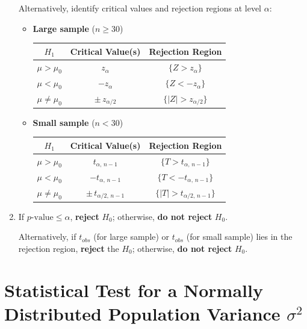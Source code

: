 \documentclass[twoside]{book}
\begin{document}
\begin{enumerate}
Alternatively, identify critical values and rejection regions at level $\alpha$:

	\begin{itemize}

		\item \textbf{Large sample} (\(n \ge 30\))
		\begin{table}[H]
			\centering
			\begin{tabular}{@{}c|c|c@{}}
				\toprule
				\textbf{$H_1$} & \textbf{Critical Value(s)} & \textbf{Rejection Region} \\
				\midrule
				$\mu > \mu_0$ & $ z_{\alpha} $ &
				\(\{Z>z_{\alpha}\}\) \\[6pt]
				$\mu < \mu_0$ &
				$ -z_{\alpha} $ &
				\(\{Z<-z_{\alpha}\}\) \\[6pt]
				$\mu \neq \mu_0$ &
				$ \pm\,z_{\alpha/2} $&
				$\{|Z| > z_{\alpha/2}\}$ \\
				\bottomrule
			\end{tabular}
		\end{table}
	\item \textbf{Small sample} (\(n < 30\))
		\begin{table}[H]
			\centering
			\begin{tabular}{@{}c|c|c@{}}
				\toprule
				\textbf{$H_1$} & \textbf{Critical Value(s)} & \textbf{Rejection Region} \\
				\midrule
				$\mu > \mu_0$ & $ t_{\alpha,\,n-1} $ & $\{T > t_{\alpha,\,n-1}\}$ \\[6pt]
				$\mu < \mu_0$ & $ -t_{\alpha,\,n-1} $ & $\{T < -t_{\alpha,\,n-1}\}$ \\[6pt]
				$\mu \neq \mu_0$ & $ \pm\,t_{\alpha/2,\,n-1} $ & $\{|T| > t_{\alpha/2,\,n-1}\}$ \\
				\bottomrule
			\end{tabular}
		\end{table}
	\end{itemize}

	\item If \(p\text{-value} \le \alpha\), \textbf{reject} \(H_0\); otherwise, \textbf{do not reject} \(H_0\).

	Alternatively, if $t_{obs}$ (for large sample) or $t_{obs}$ (for small sample) lies in the rejection region, \textbf{reject} the \(H_0\); otherwise, \textbf{do not reject} \(H_0\).
\end{enumerate}


\section{Statistical Test for a Normally Distributed Population Variance \(\sigma^2\)}
\end{document}
